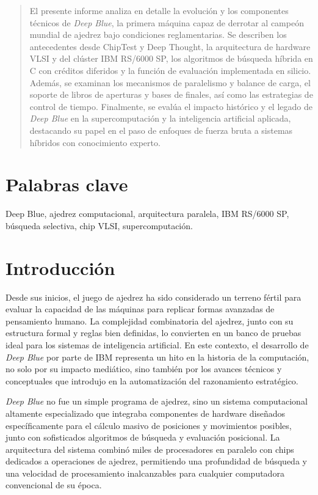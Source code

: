 \documentclass[a4paper, 12pt]{article}
\begin{document}
\begin{abstract}
    El presente informe analiza en detalle la evolución y los 
    componentes técnicos de \textit{Deep Blue}, la primera 
    máquina capaz de derrotar al campeón mundial de ajedrez 
    bajo condiciones reglamentarias. Se describen los 
    antecedentes desde ChipTest y Deep Thought, la arquitectura 
    de hardware VLSI y del clúster IBM RS/6000 SP, los 
    algoritmos de búsqueda híbrida en C con créditos diferidos y 
    la función de evaluación implementada en silicio. Además, 
    se examinan los mecanismos de paralelismo y balance de carga, 
    el soporte de libros de aperturas y bases de finales, así 
    como las estrategias de control de tiempo. Finalmente, se 
    evalúa el impacto histórico y el legado de \textit{Deep Blue} 
    en la supercomputación y la inteligencia artificial aplicada, 
    destacando su papel en el paso de enfoques de fuerza bruta a 
    sistemas híbridos con conocimiento experto.
\end{abstract}

\section*{Palabras clave}
Deep Blue, 
ajedrez computacional, 
arquitectura paralela, 
IBM RS/6000 SP, 
búsqueda selectiva,
chip VLSI,
supercomputación.
    

\newpage
\section{Introducción}

Desde sus inicios, el juego de ajedrez ha sido considerado un 
terreno fértil para evaluar la capacidad de las máquinas para 
replicar formas avanzadas de pensamiento humano. La complejidad 
combinatoria del ajedrez, junto con su estructura formal y 
reglas bien definidas, lo convierten en un banco de pruebas 
ideal para los sistemas de inteligencia artificial. En este 
contexto, el desarrollo de \textit{Deep Blue} por parte de IBM 
representa un hito en la historia de la computación, no solo por 
su impacto mediático, sino también por los avances técnicos y 
conceptuales que introdujo en la automatización del razonamiento 
estratégico.

\textit{Deep Blue} no fue un simple programa de ajedrez, sino un 
sistema computacional altamente especializado que integraba 
componentes de hardware diseñados específicamente para el 
cálculo masivo de posiciones y movimientos posibles, junto con 
sofisticados algoritmos de búsqueda y evaluación posicional. La 
arquitectura del sistema combinó miles de procesadores en 
paralelo con chips dedicados a operaciones de ajedrez, 
permitiendo una profundidad de búsqueda y una velocidad de 
procesamiento inalcanzables para cualquier computadora 
convencional de su época.
\end{document}
